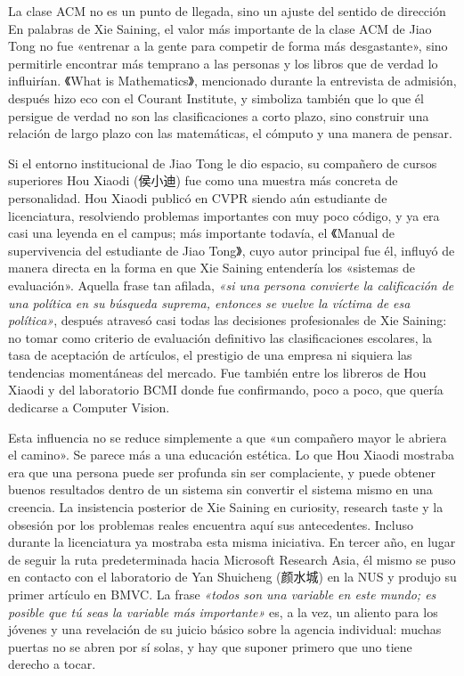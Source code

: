 \begin{importantbox}{La clase ACM no es un punto de llegada, sino un ajuste del sentido de dirección}
En palabras de Xie Saining, el valor más importante de la clase ACM de Jiao Tong no fue «entrenar a la gente para competir de forma más desgastante», sino permitirle encontrar más temprano a las personas y los libros que de verdad lo influirían. 《What is Mathematics》, mencionado durante la entrevista de admisión, después hizo eco con el Courant Institute, y simboliza también que lo que él persigue de verdad no son las clasificaciones a corto plazo, sino construir una relación de largo plazo con las matemáticas, el cómputo y una manera de pensar.
\end{importantbox}

Si el entorno institucional de Jiao Tong le dio espacio, su compañero de cursos superiores Hou Xiaodi (侯小迪) fue como una muestra más concreta de personalidad. Hou Xiaodi publicó en CVPR siendo aún estudiante de licenciatura, resolviendo problemas importantes con muy poco código, y ya era casi una leyenda en el campus; más importante todavía, el 《Manual de supervivencia del estudiante de Jiao Tong》, cuyo autor principal fue él, influyó de manera directa en la forma en que Xie Saining entendería los «sistemas de evaluación». Aquella frase tan afilada, \textit{«si una persona convierte la calificación de una política en su búsqueda suprema, entonces se vuelve la víctima de esa política»}, después atravesó casi todas las decisiones profesionales de Xie Saining: no tomar como criterio de evaluación definitivo las clasificaciones escolares, la tasa de aceptación de artículos, el prestigio de una empresa ni siquiera las tendencias momentáneas del mercado. Fue también entre los libreros de Hou Xiaodi y del laboratorio BCMI donde fue confirmando, poco a poco, que quería dedicarse a Computer Vision.

Esta influencia no se reduce simplemente a que «un compañero mayor le abriera el camino». Se parece más a una educación estética. Lo que Hou Xiaodi mostraba era que una persona puede ser profunda sin ser complaciente, y puede obtener buenos resultados dentro de un sistema sin convertir el sistema mismo en una creencia. La insistencia posterior de Xie Saining en curiosity, research taste y la obsesión por los problemas reales encuentra aquí sus antecedentes. Incluso durante la licenciatura ya mostraba esta misma iniciativa. En tercer año, en lugar de seguir la ruta predeterminada hacia Microsoft Research Asia, él mismo se puso en contacto con el laboratorio de Yan Shuicheng (颜水城) en la NUS y produjo su primer artículo en BMVC. La frase \textit{«todos son una variable en este mundo; es posible que tú seas la variable más importante»} es, a la vez, un aliento para los jóvenes y una revelación de su juicio básico sobre la agencia individual: muchas puertas no se abren por sí solas, y hay que suponer primero que uno tiene derecho a tocar.

